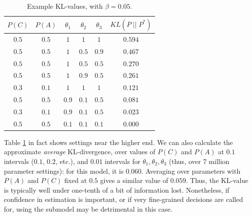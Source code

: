 \documentclass[10pt,letterpaper]{article}
\begin{document}
\begin{table}[h]  \begin{center}
\begin{tabular}{c | c | c | c | c || c}
 $P(C)$ & $P(A)$ & $\theta_1$ & $\theta_2$ & $\theta_3$ & $KL(P \;\vert\vert\; P^*)$ \\ \hline
 $0.5$ & $0.5$ & $1$ & $1$ & $1$  & $0.594$ \\
  $0.5$ & $0.5$ & $1$ & $0.5$ & $0.9$  & $0.467$ \\
  $0.5$ & $0.5$ &$1$ & $0.5$ & $0.5$  & $0.270$ \\
 $0.5$ & $0.5$ & $1$ & $0.9$ & $0.5$  & $0.261$ \\
  $0.3$ & $0.1$ & $1$ & $1$ & $1$ & $0.121$ \\
 $0.5$ & $0.5$ &  $0.9$ & $0.1$ & $0.5$  & $0.081$ \\
  $0.3$ & $0.1$ & $0.9$ & $0.1$ & $0.5$ & $0.023$ \\
 $0.5$ & $0.5$ & $0.1$ & $0.1$ & $0.1$ & $0.000$ 
\end{tabular} \end{center} \caption{Example KL-values, with $\beta = 0.05$.} \label{table1}
\end{table}
Table \ref{table1} in fact shows settings near the higher end. We can also calculate the approximate \emph{average} KL-divergence, over values of $P(C)$ and $P(A)$ at $0.1$ intervals ($0.1$, $0.2$, etc.), and $0.01$ intervals for $\theta_1,\theta_2,\theta_3$ (thus, over 7 million parameter settings): for this model, it is $0.060$. Averaging over parameters with $P(A)$ and $P(C)$ fixed at $0.5$ gives a similar value of $0.059$.
Thus, the KL-value is typically well under one-tenth of a bit of information lost.
Nonetheless, if confidence in estimation is important, or if very fine-grained decisions are called for, using the submodel may be detrimental in this case. 
\end{document}
